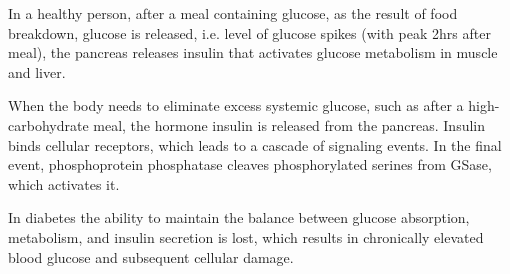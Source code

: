 In a healthy person, after a meal containing glucose, as the result of food
breakdown, glucose is released, i.e. level of glucose spikes (with peak 2hrs
after meal), the pancreas releases insulin that activates glucose metabolism in
muscle and liver.

When the body needs to eliminate excess systemic glucose, such as after a
high-carbohydrate meal, the hormone insulin is released from the pancreas.
Insulin binds cellular receptors, which leads to a cascade of signaling events.
In the final event, phosphoprotein phosphatase cleaves phosphorylated serines
from GSase, which activates it.

In diabetes the ability to maintain the balance between glucose absorption,
metabolism, and insulin secretion is lost, which results in chronically elevated
blood glucose and subsequent cellular damage.

